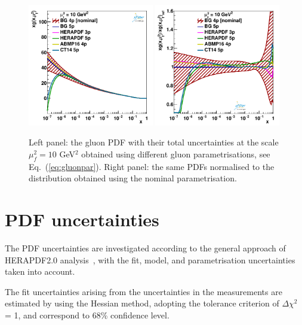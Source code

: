 \documentclass[12pt]{article}
\begin{document}
\begin{figure}
    \centering
    \includegraphics[width=0.49\textwidth]{figs/gluonpar/q2_10_pdf_g.pdf}
    \includegraphics[width=0.49\textwidth]{figs/gluonpar/q2_10_pdf_g_ratio.pdf}
    \caption{Left panel: the gluon PDF with their total uncertainties at the scale $\mu^2_f=10$ GeV$^2$ obtained using different gluon parametrisations, see Eq.~(\ref{eq:gluonpar}). Right panel: the same PDFs normalised to the distribution obtained using the nominal parametrisation.}
    \label{fig:gluonpar}
\end{figure}

\section{PDF uncertainties}
\label{sec:pdfunc}

The PDF uncertainties are investigated according to the general approach of HERAPDF2.0 analysis~\cite{Abramowicz:2015mha}, with the fit, model, and parametrisation uncertainties taken into account.

The fit uncertainties arising from the uncertainties in the measurements are estimated by using the Hessian method, adopting the tolerance criterion of $\Delta \chi^2$ = 1, and correspond to 68\% confidence level.
\end{document}
